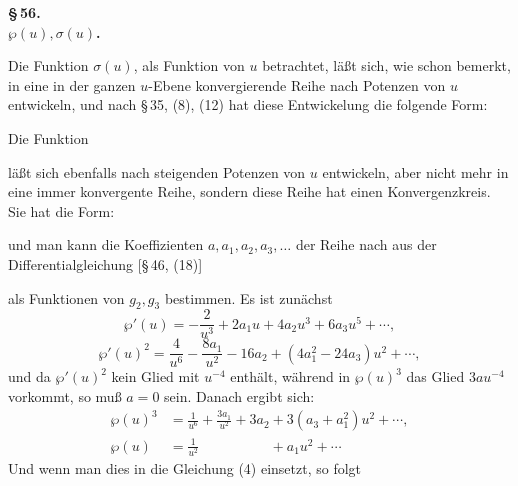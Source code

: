 
\begin{center}
\textbf{\S\,56. }\\
{\boldmath\textbf{$\wp(u), \sigma(u)$.}}
\end{center}

Die Funktion $\sigma(u)$, als Funktion von $u$ betrachtet, läßt sich,
wie schon bemerkt, in eine in der ganzen $u$-Ebene konvergierende
Reihe nach Potenzen von $u$ entwickeln, und nach \S\,35, (8), (12)
hat diese Entwickelung die folgende Form:


Die Funktion


läßt sich ebenfalls nach steigenden Potenzen von $u$ entwickeln,
aber nicht mehr in eine immer konvergente Reihe, sondern diese
Reihe hat einen Konvergenzkreis. Sie hat die Form:


und man kann die Koeffizienten $a, a_1, a_2, a_3, \ldots$ der Reihe nach
aus der Differentialgleichung [\S\,46, (18)]


als Funktionen von $g_2, g_3$ bestimmen.
Es ist zunächst
\[
\wp'(u) = -\frac{2}{u^3} + 2a_1 u + 4a_2 u^3 + 6a_3 u^5 + \cdots,
\]
\[
\wp'(u)^2 = \frac{4}{u^6} - \frac{8a_1}{u^2} - 16a_2 + (4a_1^2 - 24a_3)u^2 + \cdots,
\]
und da $\wp'(u)^2$ kein Glied mit $u^{-4}$ enthält, während in $\wp(u)^3$
das Glied $3au^{-4}$ vorkommt, so muß $a=0$ sein. Danach ergibt
sich:
\[
\begin{aligned}
\wp(u)^3 &= \frac{1}{u^6} + \frac{3a_1}{u^2} + 3a_2 + 3(a_3+a_1^2)u^2 + \cdots,\\
\wp(u) &= \frac{1}{u^2} \phantom{{}+ \frac{3a_1}{u^2} + 3a_2{}} + a_1 u^2 + \cdots
\end{aligned}
\]
Und wenn man dies in die Gleichung (4) einsetzt, so folgt

